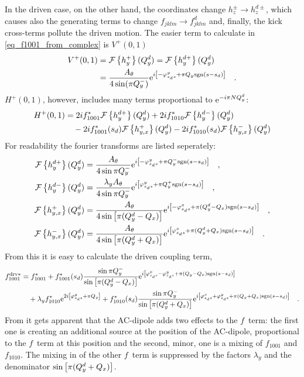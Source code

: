 %
In the driven case, on the other hand, the coordinates change $h_z^\pm \rightarrow h_z^{d\pm}$, which
causes also the generating terms to change $f_{jklm} \rightarrow f^d_{jklm}$ and, finally, the kick
cross-terms pollute the driven motion.
The easier term to calculate in \eqref{eq_f1001_from_complex} is $V^+(0,1)$
%
\begin{align}
    V^+(0,1) &= \mathcal{F} \left\{ h_y^+ \right\}(Q_y^d) = \mathcal{F} \left\{ h_y^{d+} \right\}(Q_y^d)
    \notag \\
    &= \frac{A_\theta}{4\sin(\pi Q_y^-)}
        \text{e}^{i\left[-\varphi_{s_ds}^{y} + \pi Q_y\text{sgn}(s-s_d)\right]}
        \quad .
\end{align}
%
$H^+(0,1)$, however, includes many terms proportional to $\text{e}^{-i\pi N Q_y^d}$:
%
\begin{align}
   H^+(0,1) &=
    2i f_{1001}^*      \mathcal{F} \left\{ h_y^{d+} \right\}(Q_y^d)
   +2i f_{1010}^*      \mathcal{F} \left\{ h_y^{d-} \right\}(Q_y^d)
   \notag \\&\quad
   -2i f_{1001}^*(s_d) \mathcal{F} \left\{ h_{y,x}^{+} \right\}(Q_y^d)
   -2i f_{1010}^*(s_d) \mathcal{F} \left\{ h_{y,x}^{-} \right\}(Q_y^d)
\end{align}
%
For readability the fourier transforms are listed seperately:
%
\begin{align}
    \mathcal{F} \left\{ h_y^{d+} \right\}(Q_y^d) &= \frac{A_\theta}{4\sin\pi Q_y^-}
        \text{e}^{i\left[-\varphi_{s_ds}^{y} + \pi Q_y^-\text{sgn}(s-s_d)\right]}
    \quad ,
    \notag \\
    \mathcal{F} \left\{ h_y^{d-} \right\}(Q_y^d) &= \frac{\lambda_y A_\theta}{4\sin\pi Q_y^-}
        \text{e}^{i\left[\varphi_{s_ds}^{y} + \pi Q_y^+\text{sgn}(s-s_d)\right]}
    \quad ,
    \notag \\
    \mathcal{F} \left\{ h_{y,x}^{+} \right\}(Q_y^d) &= \frac{A_\theta}{4\sin\left[\pi (Q_y^d - Q_x)\right]}
        \text{e}^{i\left[-\varphi_{s_ds}^{x} + \pi (Q_y^d - Q_x)\text{sgn}(s-s_d)\right]}
    \quad ,
    \notag \\
    \mathcal{F} \left\{ h_{y,x}^{-} \right\}(Q_y^d) &= \frac{A_\theta}{4\sin\left[\pi (Q_y^d + Q_x)\right]}
        \text{e}^{i\left[\varphi_{s_ds}^{x} + \pi (Q_y^d + Q_x)\text{sgn}(s-s_d)\right]}
    \quad .
\end{align}
%
From this it is easy to calculate the driven coupling term,
%
\begin{align}
    f_{1001}^{\text{drv}*} &=
    f_{1001}^*
    + f_{1001}^*(s_d) \frac{\sin\pi Q_y^-}{\sin\left[\pi (Q_y^d-Q_x)\right]}
        \text{e}^{i\left[\varphi_{s_ds}^{x} -\varphi_{s_ds}^{y} + \pi(Q_y-Q_x)\text{sgn}(s-s_d)\right]}
        \notag \\
    &\quad
    + \lambda_y f_{1010}^*\text{e}^{2i\left[ \varphi_{s_ds}^{y} + \pi Q_y\right]}
    + f_{1010}^*(s_d) \frac{\sin\pi Q_y^-}{\sin\left[\pi (Q_y^d+Q_x)\right]}
        \text{e}^{i\left[\varphi_{s_ds}^{x} + \varphi_{s_ds}^{y} + \pi(Q_y+Q_x)\text{sgn}(s-s_d)\right]}
        \quad .
    \label{eq_drv_f1001_final}
\end{align}
%
From  it gets apparent that the AC-dipole adds two effects to the $f$~term:
the first one is creating an additional source at the position of the AC-dipole, proportional to the $f$~term
at this position
and the second, minor, one is a mixing of $f_{1001}$ and $f_{1010}$. The mixing in of the other $f$~term is
suppressed by the factors $\lambda_{y}$ and the denominator $\sin\left[\pi (Q^{d}_{y} + Q_x)\right]$.

